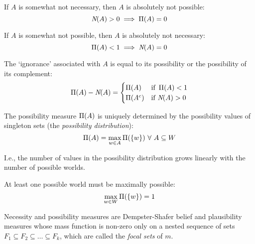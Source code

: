 \begin{proposition}
  If $A$ is somewhat not necessary, then $A$ is absolutely not possible:
  \begin{equation}
    \textit{N}(A) > 0 \implies \operatorname*{\Pi}(A) = 0
  \end{equation}
\end{proposition}

\begin{proposition}
  If $A$ is somewhat not possible, then $A$ is absolutely not necessary:
  \begin{equation}
    \operatorname*{\Pi}(A) < 1 \implies \textit{N}(A) = 0
  \end{equation}
\end{proposition}

\begin{proposition}[`Ignorance' of $A$]
  The `ignorance' associated with $A$ is equal to its possibility or the
  possibility of its complement:
  \begin{equation}
    \operatorname*{\Pi}(A) - \textit{N}(A) =
    \begin{cases}
      \operatorname*{\Pi}(A)   & \text{if } \operatorname*{\Pi}(A) < 1
      \\
      \operatorname*{\Pi}(A^c) & \text{if } \textit{N}(A) > 0
    \end{cases}
  \end{equation}
\end{proposition}

\begin{proposition}
  The possibility measure $\operatorname*{\Pi}(A)$ is uniquely determined by the
  possibility values of singleton sets (the \emph{possibility distribution}):
  \begin{equation}
    \poss(A) = \max_{w \in A} \poss(\{w\}) \ \forall\ A \subseteq W
  \end{equation}
\end{proposition}
I.e., the number of values in the possibility distribution grows linearly with
the number of possible worlds.

\begin{proposition}
  At least one possible world must be maximally possible:
  \begin{equation}
    \max_{w \in W} \operatorname*{\Pi}(\{w\}) = 1
  \end{equation}
\end{proposition}

Necessity and possibility measures are Dempster-Shafer belief and plausibility
measures whose mass function is non-zero only on a nested sequence of sets $F_1
  \subseteq F_2\subseteq\dots\subseteq F_k$, which are called the \emph{focal
  sets} of $m$.

